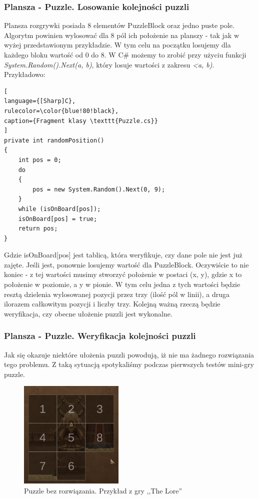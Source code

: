 \documentclass[oneside,polski,logo]{amuthesis}
\begin{document}
\subsubsection{Plansza - Puzzle. Losowanie kolejności puzzli}
\par Plansza rozgrywki posiada 8 elementów PuzzleBlock oraz jedno puste pole.  Algorytm powinien wylosować dla 8 pól ich położenie na planszy - tak jak w wyżej przedstawionym przykładzie. W tym celu na początku losujemy dla każdego bloku wartość od 0 do 8. W C\# możemy to zrobić przy użyciu funkcji  \emph{System.Random().Next(a, b)}, który losuje wartości z zakresu \emph{<a, b)}. Przykładowo:
\begin{lstlisting}[
language={[Sharp]C},
rulecolor=\color{blue!80!black},
caption={Fragment klasy \texttt{Puzzle.cs}}
]
private int randomPosition()
{
    int pos = 0;
    do
    {
        pos = new System.Random().Next(0, 9);
    }
    while (isOnBoard[pos]);
    isOnBoard[pos] = true;
    return pos;
}
\end{lstlisting}

Gdzie isOnBoard[pos] jest tablicą, która weryfikuje, czy dane pole nie jest już zajęte. Jeśli jest, ponownie losujemy wartość dla PuzzleBlock. Oczywiście to nie koniec - z tej wartości musimy stworzyć położenie w postaci (x, y), gdzie x to położenie w poziomie, a y w pionie. W tym celu jedna z tych wartości będzie resztą dzielenia wylosowanej pozycji przez trzy (ilość pól w linii), a druga ilorazem całkowitym pozycji i liczby trzy. 
Kolejną ważną rzeczą będzie weryfikacja, czy obecne ułożenie puzzli jest wykonalne.

\subsubsection{Plansza - Puzzle. Weryfikacja kolejności puzzli}
\par Jak się okazuje niektóre ułożenia puzzli powodują, iż nie ma żadnego rozwiązania tego problemu. Z taką sytuacją spotykaliśmy podczas pierwszych testów mini-gry puzzle. 
\begin{figure}[h]
	\centering
	\includegraphics[width=5cm]{images/tyrek/puzzle_1.png}
	\caption{Puzzle bez rozwiązania. Przykład z gry ,,The Lore''}
\end{figure}
\end{document}

